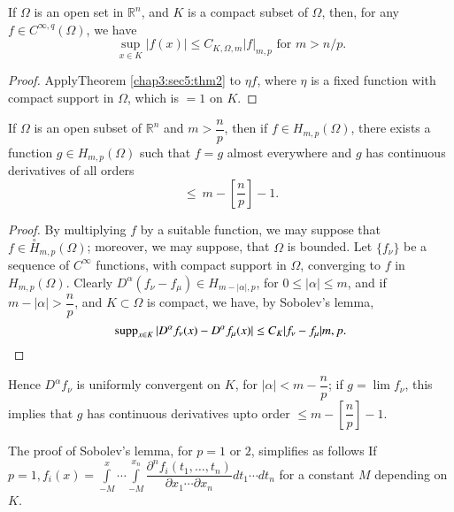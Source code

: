\setcounter{corollary}{0}
\begin{corollary}\label{chap3:sec5:coro1} %
  If $\Omega$ is an open set in $\mathbb{R}^n$, and $K$ is a compact
  subset of $\Omega$, then, for any $f \in C^{\infty, q}(\Omega)$, we
  have 
  $$
  \sup_{x \in K} | f (x) | \le C_{K, \Omega, m} |f |_{m, p} \text { for } m > n/p.
  $$
\end{corollary}

\begin{proof}
  Apply\pageoriginale Theorem \ref{chap3:sec5:thm2} to $\eta f$, where
  $\eta$ is a fixed function with 
  compact support in $\Omega$, which is $= 1$ on $K$. 
\end{proof}

\begin{corollary}\label{chap3:sec5:coro2} %
  If $\Omega$ is an open subset of $\mathbb{R}^n$ and $m >
  \dfrac{n}{p}$, then if $f \in H_{m, p}(\Omega)$, there exists a
  function $g \in H_{m, p} (\Omega)$ such that $f = g$ almost
  everywhere and $g$ has continuous derivatives of all orders  
  $$
  \le ~ m - \left[\frac{n}{p}\right ] - 1.
  $$
\end{corollary}

\begin{proof}
  By multiplying $f$ by a suitable function, we may suppose that $f
  \in \overset{\circ}{H}_{m, p} (\Omega)$; moreover, we may suppose, that
  $\Omega$ is bounded. Let $\{f_\nu\}$ be a sequence of $C^\infty$
  functions, with compact support in $\Omega$, converging to $f$ in
  $H_{m, p}(\Omega)$. Clearly $D^\alpha (f_\nu - f_\mu ) \in H_{m - |
    \alpha | , p}$, for $0 \le | \alpha | \le m$, and if $m - | \alpha
  | > \dfrac{n}{p}$, and $K \subset \Omega$ is compact, we have, by
  Sobolev's  lemma,
  $$
  \operatorname{supp}_{x \in K} | D^\alpha f_\nu (x) - D^\alpha f_\mu (x) | \le C_K
  | f_\nu - f_\mu |{m, p}. 
  $$
\end{proof}

Hence $D^\alpha f_\nu$ is uniformly convergent on $K$, for $|\alpha | <
m - \dfrac{n}{p}$; if $g = \lim f_\nu$, this implies that $g$ has
continuous derivatives upto order $\le m -\left[\dfrac{n}{p} \right ]
- 1$. 

\begin{remark*} %
  The proof of Sobolev's lemma, for $p = 1$ or $2$,  simplifies as
  follows If $p = 1, f_i (x) = \int\limits_{-M}^x \cdots
  \int\limits_{-M}^{x_n} \dfrac{\partial^n f_i (t_1, \ldots ,
    t_n)}{\partial x_1 \cdots \partial x_n} dt_1 \cdots dt_n$ for a
  constant $M$ depending on $K$. 
\end{remark*}

